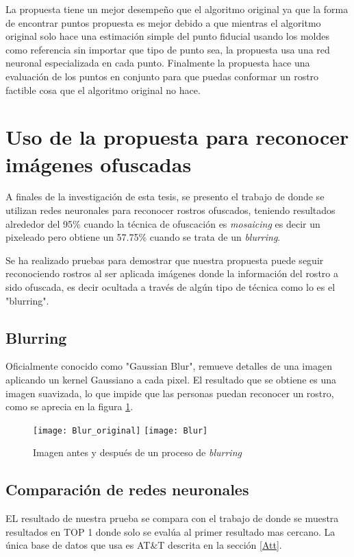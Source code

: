 La propuesta tiene un mejor desempeño que el algoritmo original ya que la forma de encontrar puntos propuesta es mejor debido a que mientras el algoritmo original solo hace una estimación simple del punto fiducial usando los moldes como referencia sin importar que tipo de punto sea, la propuesta usa una red neuronal especializada en cada punto. Finalmente la propuesta hace una evaluación de los puntos en conjunto para que puedas conformar un rostro factible cosa que el algoritmo original no hace.

\section{Uso de la propuesta para reconocer imágenes ofuscadas}
A finales de la investigación de esta tesis, se presento el trabajo de \cite{mcpherson2016defeating} donde se utilizan redes neuronales para reconocer rostros ofuscados,  teniendo resultados alrededor del 95\% cuando la técnica de ofuscación es \textit{mosaicing} es decir un pixeleado pero obtiene un 57.75\% cuando se trata de un \textit{blurring}.

Se ha realizado pruebas para demostrar que nuestra propuesta puede seguir reconociendo rostros al ser aplicada imágenes donde la información del rostro a sido ofuscada, es decir ocultada a través de algún tipo de técnica como lo es el "blurring". 

\subsection{Blurring}
Oficialmente conocido como "Gaussian Blur", remueve detalles de una imagen aplicando un kernel Gaussiano a cada pixel. El resultado que se obtiene es una imagen suavizada, lo que impide que las personas puedan reconocer un rostro, como se aprecia en la figura \ref{im:Blur}.

\begin{figure}[h]
	\centering
	\texttt{[image: Blur\_original]}
    \texttt{[image: Blur]}
    \caption{Imagen antes y después de un proceso de \textit{blurring}}
    \label{im:Blur}
\end{figure}

\subsection{Comparación de redes neuronales}
EL resultado de nuestra prueba se compara con el trabajo de \cite{mcpherson2016defeating} donde se muestra resultados en TOP 1 donde solo se evalúa al primer resultado mas cercano. La única base de datos que usa es AT\&T descrita en la sección \ref{Att}.


